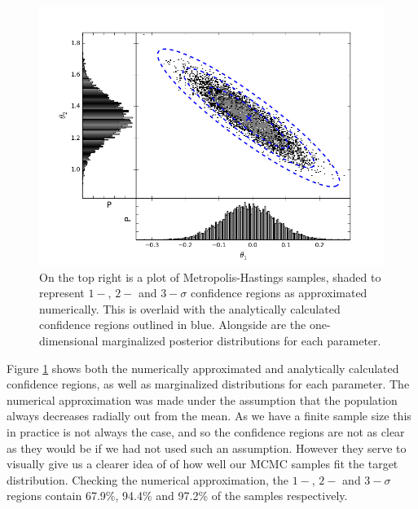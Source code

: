\documentclass[a4paper,11pt,twoside]{article}
\begin{document}
\begin{figure}[!ht]
	\centering
	\includegraphics[width=\textwidth]{marginalized.png}
	\caption{On the top right is a plot of Metropolis-Hastings samples, shaded to
	represent $1-$, $2-$ and $3-\sigma$ confidence regions as approximated
	numerically. This is overlaid with the analytically calculated confidence
	regions outlined in blue. Alongside are the one-dimensional marginalized posterior
	distributions for each parameter.}
	\label{fig:marginalized}
\end{figure}

Figure \ref{fig:marginalized} shows both the numerically approximated and
analytically calculated confidence regions, as well as marginalized
distributions for each parameter. The numerical approximation was made under
the assumption that the population always decreases radially out from the mean.
As we have a finite sample size this in practice is not always the case, and so
the confidence regions are not as clear as they would be if we had not used
such an assumption. However they serve to visually give us a clearer idea of of
how well our MCMC samples fit the target distribution. Checking the numerical
approximation, the $1-$, $2-$ and $3-\sigma$ regions contain 67.9\%, 94.4\% and
97.2\% of the samples respectively.
\end{document}
